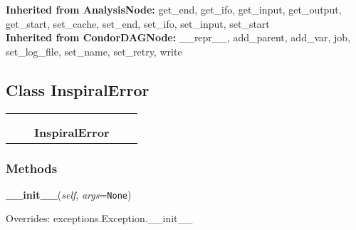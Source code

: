   \textbf{Inherited from AnalysisNode:}
    get\_end,
    get\_ifo,
    get\_input,
    get\_output,
    get\_start,
    set\_cache,
    set\_end,
    set\_ifo,
    set\_input,
    set\_start
    \\
  \textbf{Inherited from CondorDAGNode:}
    \_\_repr\_\_,
    add\_parent,
    add\_var,
    job,
    set\_log\_file,
    set\_name,
    set\_retry,
    write


\subsection{Class InspiralError}

    \label{inspiral:InspiralError}
\begin{tabular}{cccccc}
\multicolumn{2}{r}{\settowidth{\BCL}{exceptions.Exception}\multirow{2}{\BCL}{exceptions.Exception}}
&&
  \\\cline{3-3}
  &&\multicolumn{1}{c|}{}
&&
  \\
&&\multicolumn{2}{l}{\textbf{InspiralError}}
\end{tabular}



  \subsubsection{Methods}

    \label{inspiral:InspiralError:__init__}
    \vspace{0.5ex}

    \noindent\begin{boxedminipage}{\textwidth}

    \raggedright \textbf{\_\_init\_\_}(\textit{self}, \textit{args}=\texttt{N\-o\-n\-e\-})

      Overrides: exceptions.Exception.\_\_init\_\_

    \end{boxedminipage}

